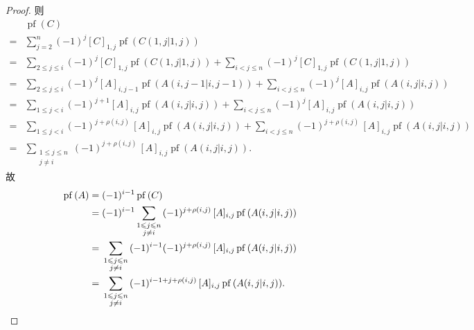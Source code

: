 \documentclass[../libro.tex]{subfiles}
\begin{document}
\begin{proof}
    则
    \begin{align*}
        &
        \operatorname{pf} {(C)}
        \\
        = {} &
        \sum_{j = 2}^{n}
        {(-1)^{j} [C]_{1,j}
        \operatorname{pf} {(C({1,j}|{1,j}))}}
        \\
        = {} &
        \sum_{2 \leq j \leq i}
        {(-1)^{j} [C]_{1,j}
        \operatorname{pf} {(C({1,j}|{1,j}))}}
        +
        \sum_{i < j \leq n}
        {(-1)^{j} [C]_{1,j}
        \operatorname{pf} {(C({1,j}|{1,j}))}}
        \\
        = {} &
        \sum_{2 \leq j \leq i}
        {(-1)^{j} [A]_{i,j-1}
        \operatorname{pf} {(A({i,j-1}|{i,j-1}))}}
        +
        \sum_{i < j \leq n}
        {(-1)^{j} [A]_{i,j}
        \operatorname{pf} {(A({i,j}|{i,j}))}}
        \\
        = {} &
        \sum_{1 \leq j < i}
        {(-1)^{j+1} [A]_{i,j}
        \operatorname{pf} {(A({i,j}|{i,j}))}}
        +
        \sum_{i < j \leq n}
        {(-1)^{j} [A]_{i,j}
        \operatorname{pf} {(A({i,j}|{i,j}))}}
        \\
        = {} &
        \sum_{1 \leq j < i}
        {(-1)^{j+\rho(i,j)}\, [A]_{i,j}
        \operatorname{pf} {(A({i,j}|{i,j}))}}
        +
        \sum_{i < j \leq n}
        {(-1)^{j+\rho(i,j)}\, [A]_{i,j}
        \operatorname{pf} {(A({i,j}|{i,j}))}}
        \\
        = {} &
        \sum_{\substack{1 \leq j \leq n \\ j \neq i}}
        {(-1)^{j+\rho(i,j)}\, [A]_{i,j}
        \operatorname{pf} {(A({i,j}|{i,j}))}}.
    \end{align*}
    故
    \begin{align*}
        \operatorname{pf} {(A)}
        = {} &
        (-1)^{i-1}
        \operatorname{pf} {(C)}
        \\
        = {} &
        (-1)^{i-1}
        \sum_{\substack{1 \leq j \leq n \\ j \neq i}}
        {(-1)^{j+\rho(i,j)}\, [A]_{i,j}
        \operatorname{pf} {(A({i,j}|{i,j}))}}
        \\
        = {} &
        \sum_{\substack{1 \leq j \leq n \\ j \neq i}}
        {
            (-1)^{i-1}
            (-1)^{j+\rho(i,j)}\, [A]_{i,j}
        \operatorname{pf} {(A({i,j}|{i,j}))}}
        \\
        = {} &
        \sum_{\substack{1 \leq j \leq n \\ j \neq i}}
        {
            (-1)^{i-1+j+\rho(i,j)}\, [A]_{i,j}
        \operatorname{pf} {(A({i,j}|{i,j}))}}.
        \qedhere
    \end{align*}
\end{proof}
\end{document}
